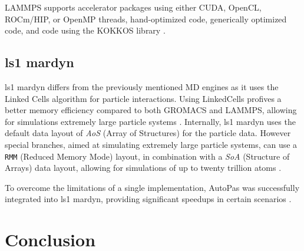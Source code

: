 \documentclass[conference]{IEEEtran}
\begin{document}
LAMMPS supports accelerator packages using either CUDA, OpenCL, ROCm/HIP, or OpenMP threads, hand-optimized
code, generically optimized code, and code using the KOKKOS library \cite{Seckler2021}.


\subsection{ls1 mardyn}

ls1 mardyn differs from the previously mentioned MD engines as it uses the Linked Cells algorithm for particle interactions. Using LinkedCells profives a better memory efficiency compared to both GROMACS and LAMMPS, allowing for simulations extremely large particle systems \cite{tchipev2019twe}. Internally, ls1 mardyn uses the default data layout of \textit{AoS} (Array of Structures) for the particle data. However special branches, aimed at simulating extremely large particle systems, can use a \texttt{RMM} (Reduced Memory Mode) layout, in combination with a \textit{SoA} (Structure of Arrays) data layout, allowing for simulations of up to twenty trillion atoms \cite{tchipev2019twe}.

To overcome the limitations of a single implementation, AutoPas was successfully integrated into ls1 mardyn, providing significant speedups in certain scenarios \cite{SECKLER2021101296}.


\newpage

\section{Conclusion}








\newpage
\newpage
\tableofcontents
\end{document}
